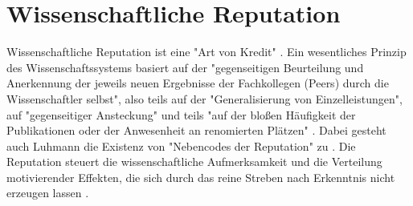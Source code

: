 \section{Wissenschaftliche Reputation}

Wissenschaftliche Reputation ist eine "Art von Kredit" \cite{luhmann_1970_selbststeuerung}. Ein wesentliches Prinzip des Wissenschaftssystems basiert auf der "gegenseitigen Beurteilung und Anerkennung der jeweils neuen Ergebnisse der Fachkollegen (Peers) durch die Wissenschaftler selbst"\cite{Hanekop_2014}, also teils auf der "Generalisierung von Einzelleistungen", auf "gegenseitiger Ansteckung" und teils "auf der bloßen Häufigkeit der Publikationen oder der Anwesenheit an renomierten Plätzen" \cite{luhmann_1970_selbststeuerung}. Dabei gesteht auch Luhmann die Existenz von "Nebencodes der Reputation" zu \cite{schmoch_2003_hochschulforschung}. Die Reputation steuert die wissenschaftliche Aufmerksamkeit und die Verteilung motivierender Effekten, die sich durch das reine Streben nach Erkenntnis nicht erzeugen lassen \cite{suchen_luhmann}.

